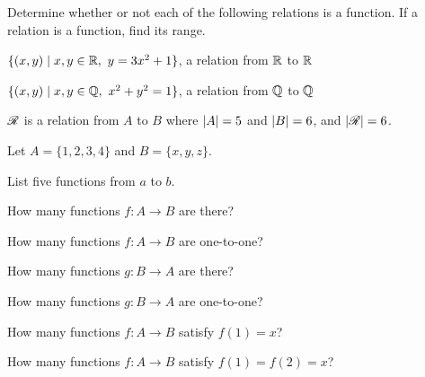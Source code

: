 \documentclass[a4paper, english, 12pt]{article} %
\begin{document}
\titlebox


\begin{problem}
  Determine whether or not each of the following relations is a function. If a
  relation is a function, find its range.
\end{problem}

\begin{subproblem}[3]
  $\{ (x, y) \mid x,y \in \mathbb{R}, \ y = 3x^2 + 1 \}$, a relation from $\mathbb{R}$ to $\mathbb{R}$
\end{subproblem}

\begin{subproblem}
  $\{ (x, y) \mid x,y \in \mathbb{Q}, \ x^2 + y^2 = 1 \}$, a relation from $\mathbb{Q}$ to $\mathbb{Q}$
\end{subproblem}

\begin{subproblem}
  $\mathscr{R}$ is a relation from $A$ to $B$ where $\lvert A\rvert=5$ and $\lvert B\rvert=6$, and $\lvert\mathscr{R}\rvert=6$.
\end{subproblem}

\begin{problem}[3]
  Let $A = \{1, 2, 3, 4\}$ and $B = \{x, y, z\}$.
\end{problem}

\begin{subproblem}
  List five functions from $a$ to $b$.
\end{subproblem}

\begin{subproblem}
  How many functions $f \colon A \to B$ are there?
\end{subproblem}

\begin{subproblem}
  How many functions $f \colon A \to B$ are one-to-one?
\end{subproblem}

\begin{subproblem}
  How many functions $g \colon B \to A$ are there?
\end{subproblem}

\begin{subproblem}
  How many functions $g \colon B \to A$ are one-to-one?
\end{subproblem}

\begin{subproblem}
  How many functions $f \colon A \to B$ satisfy $f(1) = x$?
\end{subproblem}

\begin{subproblem}
  How many functions $f \colon A \to B$ satisfy $f(1) = f(2) = x$?
\end{subproblem}
\end{document}
